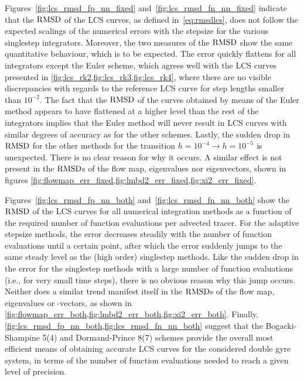 Figures~\ref{fig:lcs_rmsd_fp_nn_fixed} and~\ref{fig:lcs_rmsd_fn_nn_fixed} indicate
that the $\operatorname{RMSD}$ of the LCS curves, as defined in~\cref{eq:rmsdlcs},
does not follow the expected scalings of the numerical errors with the
stepsize for the various singlestep integrators. Moreover, the two measures of
the $\operatorname{RMSD}$ show the same quantitative behaviour, which is to be expected. The
error quickly flattens for all integrators except the Euler scheme, which agrees
well with the LCS curves presented in
\cref{fig:lcs_rk2,fig:lcs_rk3,fig:lcs_rk4}, where there are no visible
discrepancies with regards to the reference LCS curve for step lengths smaller
than $10^{-2}$. The fact that the $\operatorname{RMSD}$ of the curves obtained
by means of the Euler method appears to have flattened at a higher level than
the rest of the integrators implies that the Euler method will never result in
LCS curves with similar degrees of accuracy as for the other schemes. Lastly,
the sudden drop in $\operatorname{RMSD}$ for the other methods for the transition
$h=10^{-4}\rightarrow{h=10^{-5}}$ is unexpected. There is no clear reason for
why it occurs. A similar effect is not present in the $\operatorname{RMSD}$s of the
flow map, eigenvalues nor eigenvectors, shown in figures
\cref{fig:flowmap_err_fixed,fig:lmbd2_err_fixed,fig:xi2_err_fixed}.



Figures~\ref{fig:lcs_rmsd_fp_nn_both} and~\ref{fig:lcs_rmsd_fn_nn_both}
show the $\operatorname{RMSD}$ of the LCS curves for all numerical integration methods as a
function of the required number of function evaluations per advected tracer.
For the adaptive stepsize methods, the error decreases steadily
with the number of function evaluations until a certain point, after which
the error suddenly jumps to the same steady level as the (high order)
singlestep methods. Like the sudden drop in the error for the singlestep
methods with a large number of function evaluations (i.e., for very
small time steps), there is no obvious reason why this jump occurs. Neither
does a similar trend manifest itself in the $\operatorname{RMSD}$s of the flow map,
eigenvalues or -vectors, as shown in
\cref{fig:flowmap_err_both,fig:lmbd2_err_both,fig:xi2_err_both}. Finally,
\cref{fig:lcs_rmsd_fp_nn_both,fig:lcs_rmsd_fn_nn_both} suggest that the
Bogacki-Shampine 5(4) and Dormand-Prince 8(7) schemes provide the overall most
efficient means of obtaining accurate LCS curves for the considered double gyre
system, in terms of the number of function evaluations needed to reach a given
level of precision.

